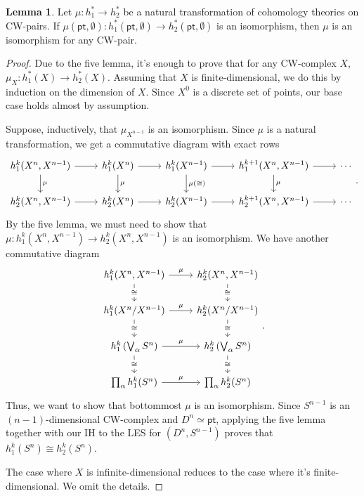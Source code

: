 \documentclass[10pt,letterpaper,cm]{nupset}
\theoremstyle{definition}
\theoremstyle{theorem}
\newtheorem{lemma}[definition]{Lemma}
\theoremstyle{remark}
\newcommand{\1}{\mathbb{1}}
\newcommand{\0}{\vec 0}
\newcommand{\pt}{\mathsf{pt}}
\begin{document}
\begin{lemma}
Let $\mu : h^{\ast}_1 \to h^{\ast}_2$ be a natural transformation of cohomology theories on CW-pairs. If $\mu(\pt, \emptyset) : h_1^{\ast}(\pt, \emptyset) \to h_2^{\ast}(\pt, \emptyset)$ is an isomorphism, then $\mu$ is an isomorphism for any CW-pair.
\end{lemma}
\begin{proof}
Due to the five lemma, it's enough to prove that for any CW-complex $X$, $\mu_X : h_1^{\ast}(X) \to h_2^{\ast}(X)$. Assuming that $X$ is finite-dimensional, we do this by induction on the dimension of $X$. Since $X^0$ is a discrete set of points, our base case holds almost by assumption.  

\medskip

 Suppose, inductively, that $\mu_{X^{n-1}}$ is an isomorphism. Since $\mu$ is a natural transformation, we get a commutative diagram with exact rows
\[
\begin{tikzcd}
{h_1^k(X^n, X^{n-1})} \arrow[r] \arrow[d, "\mu"] & h_1^k(X^n) \arrow[r] \arrow[d, "\mu"] & h_1^k(X^{n-1}) \arrow[r] \arrow[d, "\mu(\cong)"] & {h_1^{k+1}(X^n, X^{n-1})} \arrow[r] \arrow[d, "\mu"] & \cdots \\
{h_2^k(X^n, X^{n-1})} \arrow[r]                  & h_2^k(X^n) \arrow[r]                  & h_2^k(X^{n-1}) \arrow[r]                         & {h_2^{k+1}(X^n, X^{n-1})} \arrow[r]                  & \cdots
\end{tikzcd}.
\] By the five lemma, we must need to show that $\mu : h_1^k(X^n, X^{n-1}) \to h_2^k(X^n, X^{n-1})$ is an isomorphism. We have another commutative diagram
\[
\begin{tikzcd}
{h_1^k(X^n, X^{n-1})} \arrow[d, "\cong" description] \arrow[r, "\mu"]       & {h_2^k(X^n, X^{n-1})} \arrow[d, "\cong" description]       \\
h_1^k(X^n/X^{n-1}) \arrow[d, "\cong" description] \arrow[r, "\mu"]          & h_2^k(X^n/X^{n-1}) \arrow[d, "\cong" description]          \\
h_1^k\left(\bigvee_{\alpha} S^n\right) \arrow[d, "\cong" description] \arrow[r, "\mu"] & h_2^k\left(\bigvee_{\alpha} S^n\right) \arrow[d, "\cong" description] \\
\prod_{\alpha}h_1^k(S^n) \arrow[r, "\mu"]                                   & \prod_{\alpha}h_2^k(S^n)                                  
\end{tikzcd}
.\] Thus, we want to show that bottommost $\mu$ is an isomorphism. Since $S^{n-1}$ is an $(n-1)$-dimensional CW-complex and $D^n \simeq \pt$, applying the five lemma together with our IH to the LES for $(D^n, S^{n-1})$ proves that $h_1^k(S^n) \cong h_2^k(S^n)$.

\medskip

 The case where $X$ is infinite-dimensional reduces to the case where it's finite-dimensional. We omit the details. 
\end{proof}
\end{document}
